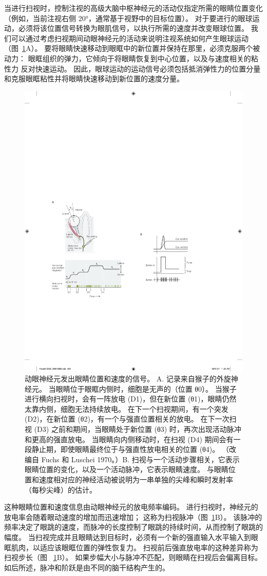 当进行扫视时，控制注视的高级大脑中枢神经元的活动仅指定所需的眼睛位置变化（例如，当前注视右侧 20°，通常基于视野中的目标位置）。
对于要进行的眼球运动，必须将该位置信号转换为眼肌信号，以执行所需的速度并改变眼球位置。
我们可以通过考虑扫视期间动眼神经元的活动来说明注视系统如何产生眼球运动（图~\ref{fig:35_7}A）。 
要将眼睛快速移动到眼眶中的新位置并保持在那里，必须克服两个被动力：
眼眶组织的弹力，它倾向于将眼睛恢复到中心位置，以及与速度相关的粘性力 反对快速运动。
因此，眼球运动的运动信号必须包括抵消弹性力的位置分量和克服眼眶粘性并将眼睛快速移动到新位置的速度分量。


\begin{figure}[htbp]
	\centering
	\includegraphics[width=0.5\linewidth]{chap35/fig_35_7}
	\caption{动眼神经元发出眼睛位置和速度的信号。 A. 记录来自猴子的外旋神经元。 当眼睛位于眼眶内侧时，细胞是无声的（位置 θ0）。 当猴子进行横向扫视时，会有一阵放电 (D1)，但在新位置 (θ1)，眼睛仍然太靠内侧，细胞无法持续放电。 在下一个扫视期间，有一个突发 (D2)，在新位置 (θ2)，有一个与强直位置相关的放电。 在下一次扫视 (D3) 之前和期间，当眼睛处于新位置 (θ3) 时，再次出现活动脉冲和更高的强直放电。 当眼睛向内侧移动时，在扫视 (D4) 期间会有一段静止期，即使眼睛最终位于与强直性放电相关的位置 (θ4)。 （改编自 Fuchs 和 Luschei 1970。）B. 扫视与一个活动步骤相关，它表示眼睛位置的变化，以及一个活动脉冲，它表示眼睛速度。 与眼睛位置和速度相对应的神经活动被说明为一串单独的尖峰和瞬时发射率（每秒尖峰）的估计。}
	\label{fig:35_7}
\end{figure}


这种眼睛位置和速度信息由动眼神经元的放电频率编码。
进行扫视时，神经元的放电率会随着眼动速度的增加而迅速增加；
这称为扫视脉冲（图~\ref{fig:35_7}B）。
该脉冲的频率决定了眼跳的速度，而脉冲的长度控制了眼跳的持续时间，从而控制了眼跳的幅度。
当扫视完成并且眼睛达到目标时，必须有一个新的强直输入水平输入到眼眶肌肉，以适应该眼眶位置的弹性恢复力。
扫视前后强直放电率的这种差异称为扫视步长（图 ~\ref{fig:35_7}B）。
如果步幅大小与脉冲不匹配，则眼睛在扫视后会偏离目标。
如后所述，脉冲和阶跃是由不同的脑干结构产生的。



